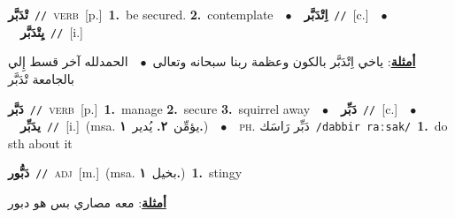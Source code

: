 \documentclass[10pt,a4paper,twoside]{article} %
\begin{document}
\begin{multicols}{2}
{\setlength\topsep{0pt}\textbf{\foreignlanguage{arabic}{تْدَبَّر}}\ {\color{gray}\texttt{//}\color{black}}\ \textsc{verb}\ [p.]\ \textbf{1.}~be secured.  \textbf{2.}~contemplate\ \ $\bullet$\ \ \setlength\topsep{0pt}\textbf{\foreignlanguage{arabic}{اِتْدَبَّر}}\ {\color{gray}\texttt{//}\color{black}}\ [c.]\ \ $\bullet$\ \ \setlength\topsep{0pt}\textbf{\foreignlanguage{arabic}{يِتْدَبَّر}}\ {\color{gray}\texttt{//}\color{black}}\ [i.]\  \begin{flushright}\color{gray}\foreignlanguage{arabic}{\textbf{\underline{\foreignlanguage{arabic}{أمثلة}}}: ياخي اِتْدَبَّر بالكون وعظمة ربنا سبحانه وتعالى\ $\bullet$\ \  الحمدلله آخر قسط إِلي بالجامعة تْدَبَّر}\end{flushright}\color{black}} \vspace{2mm}

{\setlength\topsep{0pt}\textbf{\foreignlanguage{arabic}{دَبَّر}}\ {\color{gray}\texttt{//}\color{black}}\ \textsc{verb}\ [p.]\ \textbf{1.}~manage  \textbf{2.}~secure  \textbf{3.}~squirrel away\ \ $\bullet$\ \ \setlength\topsep{0pt}\textbf{\foreignlanguage{arabic}{دَبِّر}}\ {\color{gray}\texttt{//}\color{black}}\ [c.]\ \ $\bullet$\ \ \setlength\topsep{0pt}\textbf{\foreignlanguage{arabic}{يدَبِّر}}\ {\color{gray}\texttt{//}\color{black}}\ [i.]\ \color{gray}(msa. \foreignlanguage{arabic}{يؤمِّن}~\foreignlanguage{arabic}{\textbf{٢.}}  \foreignlanguage{arabic}{يُدير}~\foreignlanguage{arabic}{\textbf{١.}})\color{black}\ \ $\bullet$\ \ \textsc{ph.} \color{gray} \foreignlanguage{arabic}{دَبِّر رَاسَك}\color{black}\ {\color{gray}\texttt{/{\sffamily dabbir raːsak}/}\color{black}}\ \textbf{1.}~do sth about it\ } \vspace{2mm}

{\setlength\topsep{0pt}\textbf{\foreignlanguage{arabic}{دَبُّور}}\ {\color{gray}\texttt{//}\color{black}}\ \textsc{adj}\ [m.]\ \color{gray}(msa. \foreignlanguage{arabic}{بخيل}~\foreignlanguage{arabic}{\textbf{١.}})\color{black}\ \textbf{1.}~stingy\  \begin{flushright}\color{gray}\foreignlanguage{arabic}{\textbf{\underline{\foreignlanguage{arabic}{أمثلة}}}: معه مصاري بس هو دبور}\end{flushright}\color{black}} \vspace{2mm}


\end{multicols}
\end{document}
